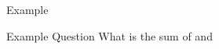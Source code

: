 \documentclass[11pt]{article}
\begin{document}
\sf\openup 2pt
\begin{quiz}{Example}

\begin{multi}[multiple,points=10]{Example Question}
What is the sum of \x and \y
%
\options
\end{multi}


\end{quiz}
\end{document}
